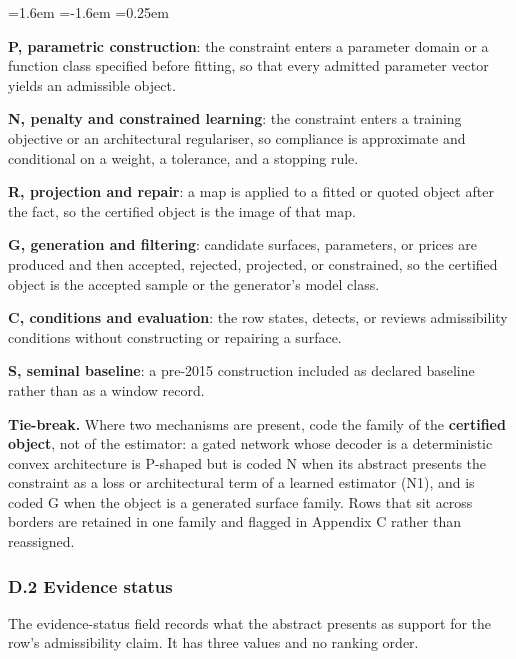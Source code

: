 \documentclass[11pt]{article}
\begin{document}
\begin{list}{}{\leftmargin=1.6em \itemindent=-1.6em \itemsep=0.25em}
\item \textbf{P, parametric construction}: the constraint enters a parameter domain or a function class specified before fitting, so that every admitted parameter vector yields an admissible object.
\item \textbf{N, penalty and constrained learning}: the constraint enters a training objective or an architectural regulariser, so compliance is approximate and conditional on a weight, a tolerance, and a stopping rule.
\item \textbf{R, projection and repair}: a map is applied to a fitted or quoted object after the fact, so the certified object is the image of that map.
\item \textbf{G, generation and filtering}: candidate surfaces, parameters, or prices are produced and then accepted, rejected, projected, or constrained, so the certified object is the accepted sample or the generator's model class.
\item \textbf{C, conditions and evaluation}: the row states, detects, or reviews admissibility conditions without constructing or repairing a surface.
\item \textbf{S, seminal baseline}: a pre-2015 construction included as declared baseline rather than as a window record.
\end{list}
\textbf{Tie-break.} Where two mechanisms are present, code the family of the \textbf{certified object}, not of the estimator: a gated network whose decoder is a deterministic convex architecture is P-shaped but is coded N when its abstract presents the constraint as a loss or architectural term of a learned estimator (N1), and is coded G when the object is a generated surface family. Rows that sit across borders are retained in one family and flagged in Appendix C rather than reassigned.

\subsubsection*{D.2 Evidence status}
The evidence-status field records what the abstract presents as support for the row's admissibility claim. It has three values and no ranking order.
\end{document}
